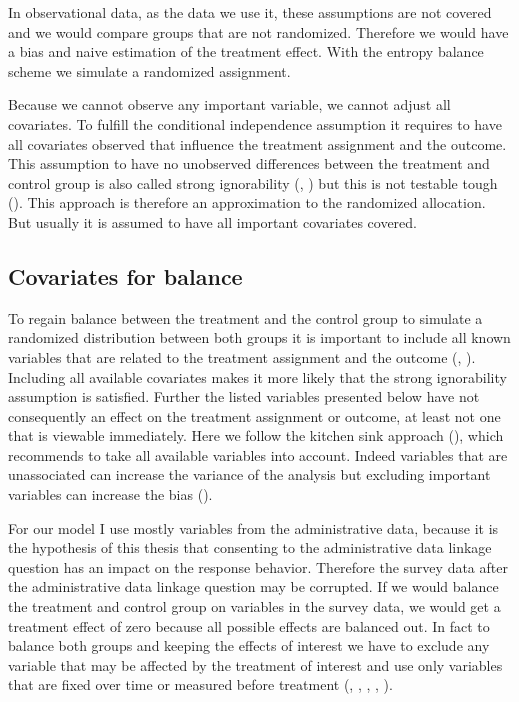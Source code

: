 In observational data, as the data we use it, these assumptions are not covered and we would compare groups that are not randomized. Therefore we would have a bias and naive estimation of the treatment effect. With the entropy balance scheme we simulate a randomized assignment.

Because we cannot observe any important variable, we cannot adjust all covariates. To fulfill the conditional independence assumption it requires to have all covariates observed that influence the treatment assignment and the outcome. This assumption to have no unobserved differences between the treatment and control group is also called strong ignorability (\cite{Stuart10}, \cite{Eckmanetal15}) but this is not testable tough (\cite{Imbens04}). This approach is therefore an approximation to the randomized allocation. But usually it is assumed to have all important covariates covered.

\subsection{Covariates for balance}\label{covar}
	
To regain balance between the treatment and the control group to simulate a randomized distribution between both groups it is important to include all known variables that are related to the treatment assignment and the outcome (\cite{Stuart10}, \cite{Eckmanetal15}). Including all available covariates makes it more likely that the strong ignorability assumption is satisfied. Further the listed variables presented below have not consequently an effect on the treatment assignment or outcome, at least not one that is viewable immediately. Here we follow the kitchen sink approach (\cite{Eckmanetal15}), which recommends to take all available variables into account. Indeed variables that are unassociated can increase the variance of the analysis but excluding important variables can increase the bias (\cite{Stuart10}).

For our model I use mostly variables from the administrative data, because it is the hypothesis of this thesis that consenting to the administrative data linkage question has an impact on the response behavior. Therefore the survey data after the administrative data linkage question may be corrupted. If we would balance the treatment and control group on variables in the survey data, we would get a treatment effect of zero because all possible effects are balanced out. In fact to balance both groups and keeping the effects of interest we have to exclude any variable that may be affected by the treatment of interest and use only variables that are fixed over time or measured before treatment (\cite{Rosenbaum84}, \cite{Frangakisetal02}, \cite{Greenland03}, \cite{Eckmanetal15}, \cite{Caliendoetal05}).


